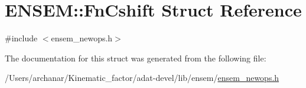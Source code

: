 \hypertarget{structENSEM_1_1FnCshift}{}\section{E\+N\+S\+EM\+:\+:Fn\+Cshift Struct Reference}
\label{structENSEM_1_1FnCshift}


{\ttfamily \#include $<$ensem\+\_\+newops.\+h$>$}



The documentation for this struct was generated from the following file\+:\begin{DoxyCompactItemize}
\item 
/\+Users/archanar/\+Kinematic\+\_\+factor/adat-\/devel/lib/ensem/\mbox{\hyperlink{adat-devel_2lib_2ensem_2ensem__newops_8h}{ensem\+\_\+newops.\+h}}\end{DoxyCompactItemize}
